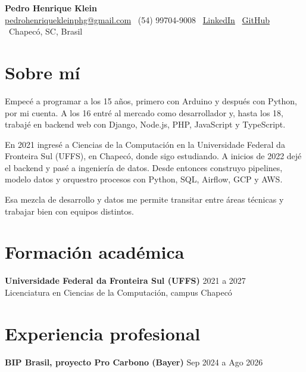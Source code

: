 \documentclass[a4paper,10pt]{article}
\begin{document}
\begin{center}
    {\LARGE \textbf{Pedro Henrique Klein}}\\
    \vspace{0.2cm}
    \href{mailto:pedrohenriquekleinphg@gmail.com}{pedrohenriquekleinphg@gmail.com} \textbar\
    (54) 99704-9008 \textbar\
    \href{https://www.linkedin.com/in/pedro-henrique-klein-a41122221/}{LinkedIn} \textbar\
    \href{https://github.com/Pedrinhonitz}{GitHub} \textbar\
    Chapecó, SC, Brasil
\end{center}

\vspace{0.3cm}

\section*{Sobre mí}

Empecé a programar a los 15 años, primero con Arduino y después con Python, por mi cuenta. A los 16 entré al mercado como desarrollador y, hasta los 18, trabajé en backend web con Django, Node.js, PHP, JavaScript y TypeScript.

En 2021 ingresé a Ciencias de la Computación en la Universidade Federal da Fronteira Sul (UFFS), en Chapecó, donde sigo estudiando. A inicios de 2022 dejé el backend y pasé a ingeniería de datos. Desde entonces construyo pipelines, modelo datos y orquestro procesos con Python, SQL, Airflow, GCP y AWS.

Esa mezcla de desarrollo y datos me permite transitar entre áreas técnicas y trabajar bien con equipos distintos.

\section*{Formación académica}

\textbf{Universidade Federal da Fronteira Sul (UFFS)} \hfill 2021 a 2027 \\
Licenciatura en Ciencias de la Computación, campus Chapecó

\section*{Experiencia profesional}

\textbf{BIP Brasil, proyecto Pro Carbono (Bayer)} \hfill Sep 2024 a Ago 2026
\end{document}
